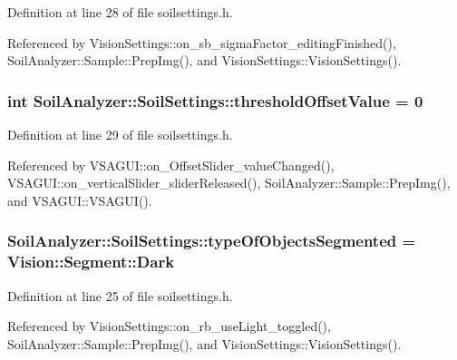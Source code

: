 Definition at line 28 of file soilsettings.\+h.



Referenced by Vision\+Settings\+::on\+\_\+sb\+\_\+sigma\+Factor\+\_\+editing\+Finished(), Soil\+Analyzer\+::\+Sample\+::\+Prep\+Img(), and Vision\+Settings\+::\+Vision\+Settings().

\hypertarget{class_soil_analyzer_1_1_soil_settings_a48330eb812672b50a94483f264614e8f}{}
\subsubsection[{threshold\+Offset\+Value}]{\setlength{\rightskip}{0pt plus 5cm}int Soil\+Analyzer\+::\+Soil\+Settings\+::threshold\+Offset\+Value = 0}\label{class_soil_analyzer_1_1_soil_settings_a48330eb812672b50a94483f264614e8f}


Definition at line 29 of file soilsettings.\+h.



Referenced by V\+S\+A\+G\+U\+I\+::on\+\_\+\+Offset\+Slider\+\_\+value\+Changed(), V\+S\+A\+G\+U\+I\+::on\+\_\+vertical\+Slider\+\_\+slider\+Released(), Soil\+Analyzer\+::\+Sample\+::\+Prep\+Img(), and V\+S\+A\+G\+U\+I\+::\+V\+S\+A\+G\+U\+I().

\hypertarget{class_soil_analyzer_1_1_soil_settings_a21ae88dba6b9b0b07d9c26812bc739fb}{}
\subsubsection[{type\+Of\+Objects\+Segmented}]{ Soil\+Analyzer\+::\+Soil\+Settings\+::type\+Of\+Objects\+Segmented = {\bf Vision\+::\+Segment\+::\+Dark}}\label{class_soil_analyzer_1_1_soil_settings_a21ae88dba6b9b0b07d9c26812bc739fb}


Definition at line 25 of file soilsettings.\+h.



Referenced by Vision\+Settings\+::on\+\_\+rb\+\_\+use\+Light\+\_\+toggled(), Soil\+Analyzer\+::\+Sample\+::\+Prep\+Img(), and Vision\+Settings\+::\+Vision\+Settings().

